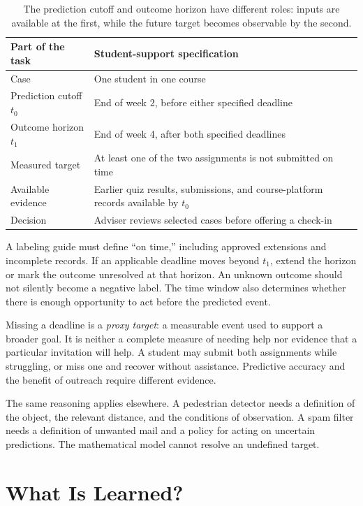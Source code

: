 \begin{table}[t]
\centering
\small
\setlength{\tabcolsep}{4pt}
\begin{tabular}{L{3.06cm}L{7.17cm}}
\toprule
Part of the task & Student-support specification \\
\midrule
Case & One student in one course \\
Prediction cutoff $t_0$ & End of week 2, before either specified deadline \\
Outcome horizon $t_1$ & End of week 4, after both specified deadlines \\
Measured target & At least one of the two assignments is not submitted on time \\
Available evidence & Earlier quiz results, submissions, and course-platform records available by $t_0$ \\
Decision & Adviser reviews selected cases before offering a check-in \\
\bottomrule
\end{tabular}
\caption{The prediction cutoff and outcome horizon have different roles: inputs are available at the first, while the future target becomes observable by the second.}
\label{tab:rough-framing-memo}
\end{table}

A labeling guide must define ``on time,'' including approved extensions and incomplete records. If an applicable deadline moves beyond $t_1$, extend the horizon or mark the outcome unresolved at that horizon. An unknown outcome should not silently become a negative label. The time window also determines whether there is enough opportunity to act before the predicted event.

Missing a deadline is a \emph{proxy target}: a measurable event used to support a broader goal. It is neither a complete measure of needing help nor evidence that a particular invitation will help. A student may submit both assignments while struggling, or miss one and recover without assistance. Predictive accuracy and the benefit of outreach require different evidence.

The same reasoning applies elsewhere. A pedestrian detector needs a definition of the object, the relevant distance, and the conditions of observation. A spam filter needs a definition of unwanted mail and a policy for acting on uncertain predictions. The mathematical model cannot resolve an undefined target.

\section{What Is Learned?}

